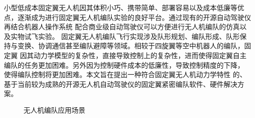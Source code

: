 小型低成本固定翼无人机因其体积小巧、携带简单、部署容易以及成本低廉等优点，逐渐成为进行固定翼无人机编队实验的良好平台。\cite{Wangxiangke2019}通过现有的开源自动驾驶仪再结合机器人操作系统
配合商业级自动驾驶仪可以方便进行无人机编队的仿真以及实物试飞实验。
固定翼无人机编队飞行实现涉及队形规划、编队形成、队形保持与变换、协调通信甚至编队避障等领域。相较于四旋翼等空中机器人的编队，固定翼
因其动力学模型的复杂性，直接导致控制上的复杂性，进而使得固定翼自主编队的任务更加困难。另外因为控制硬件成本的低廉性，导致控制精度的下降，
使得编队控制将更加困难。本文旨在提出一种符合固定翼无人机动力学特性
的、基于当前较为成熟的开源无人机自动驾驶仪的固定翼紧密编队软件、硬件解决方案。
 \begin{figure}[H]
  \centering
  \caption{无人机编队应用场景}
  \label{fig:c01-meaning}
  \end{figure}
